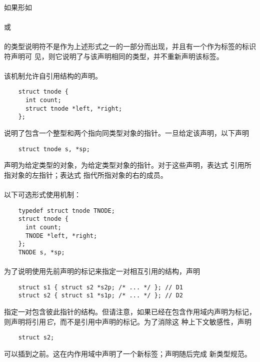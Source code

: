 {\paragraph{}
如果形如                                                                      \\
\mbox{\hspace{4em}}                            \\
或                                                                            \\
\mbox{\hspace{4em} }                                  \\
的类型说明符不是作为上述形式之一的一部分而出现，并且有一个作为标签的标识符声明可
见，则它说明了与该声明相同的类型，并不重新声明该标签。

\paragraph{}
\ex 该机制允许自引用结构的声明。
\begin{lstlisting}
    struct tnode {
      int count;
      struct tnode *left, *right;
    };
\end{lstlisting}
说明了包含一个整型和两个指向同类型对象的指针。一旦给定该声明，以下声明
\begin{lstlisting}
    struct tnode s, *sp;
\end{lstlisting}
声明为给定类型的对象，为给定类型对象的指针。对于这些声明，表达式
引用所指对象的左指针；表达式
指代所指对象的右的成员。

\paragraph{}
以下可选形式使用机制：
\begin{lstlisting}
    typedef struct tnode TNODE;
    struct tnode {
      int count;
      TNODE *left, *right;
    };
    TNODE s, *sp;
\end{lstlisting}

\paragraph{}
\ex 为了说明使用先前声明的标记来指定一对相互引用的结构，声明
\begin{lstlisting}
    struct s1 { struct s2 *s2p; /* ... */ }; // D1
    struct s2 { struct s1 *s1p; /* ... */ }; // D2
\end{lstlisting}
指定一对包含彼此指针的结构。但请注意，如果已经在包含作用域内声明为标记，
则声明将引用\textit{它}，而不是引用中声明的标记。为了消除这
种上下文敏感性，声明
\begin{lstlisting}
    struct s2;
\end{lstlisting}
可以插到之前。这在内作用域中声明了一个新标签；声明随后完成
新类型规范。

}
